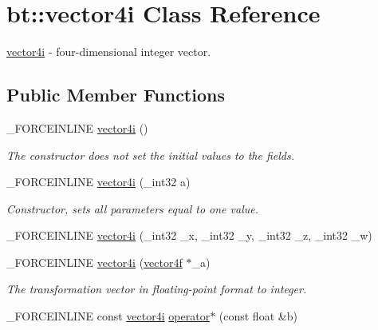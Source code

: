 \hypertarget{classbt_1_1vector4i}{\section{bt\-:\-:vector4i Class Reference}
\label{classbt_1_1vector4i}
}


\hyperlink{classbt_1_1vector4i}{vector4i} -\/ four-\/dimensional integer vector.  


\subsection*{Public Member Functions}
\begin{DoxyCompactItemize}
\item 
\hypertarget{classbt_1_1vector4i_a1dd01384bc4ec3c4c49e8f43f9c1c229}{\-\_\-\-F\-O\-R\-C\-E\-I\-N\-L\-I\-N\-E \hyperlink{classbt_1_1vector4i_a1dd01384bc4ec3c4c49e8f43f9c1c229}{vector4i} ()}\label{classbt_1_1vector4i_a1dd01384bc4ec3c4c49e8f43f9c1c229}

\begin{DoxyCompactList}\small\item\em The constructor does not set the initial values to the fields. \end{DoxyCompactList}\item 
\hypertarget{classbt_1_1vector4i_a7f2c96a45f42c89f9ff14ad58cf3bb3a}{\-\_\-\-F\-O\-R\-C\-E\-I\-N\-L\-I\-N\-E \hyperlink{classbt_1_1vector4i_a7f2c96a45f42c89f9ff14ad58cf3bb3a}{vector4i} (\-\_\-int32 a)}\label{classbt_1_1vector4i_a7f2c96a45f42c89f9ff14ad58cf3bb3a}

\begin{DoxyCompactList}\small\item\em Constructor, sets all parameters equal to one value. \end{DoxyCompactList}\item 
\-\_\-\-F\-O\-R\-C\-E\-I\-N\-L\-I\-N\-E \hyperlink{classbt_1_1vector4i_a77fbb5def0451d35bd42875aab79a344}{vector4i} (\-\_\-int32 \-\_\-x, \-\_\-int32 \-\_\-y, \-\_\-int32 \-\_\-z, \-\_\-int32 \-\_\-w)
\item 
\hypertarget{classbt_1_1vector4i_a4d500bbfcc8ee45014638b83071cc018}{\-\_\-\-F\-O\-R\-C\-E\-I\-N\-L\-I\-N\-E \hyperlink{classbt_1_1vector4i_a4d500bbfcc8ee45014638b83071cc018}{vector4i} (\hyperlink{classbt_1_1vector4f}{vector4f} $\ast$\-\_\-a)}\label{classbt_1_1vector4i_a4d500bbfcc8ee45014638b83071cc018}

\begin{DoxyCompactList}\small\item\em The transformation vector in floating-\/point format to integer. \end{DoxyCompactList}\item 
\hypertarget{classbt_1_1vector4i_a706978c8f1b70ef55e499419161dbf19}{\-\_\-\-F\-O\-R\-C\-E\-I\-N\-L\-I\-N\-E const \hyperlink{classbt_1_1vector4i}{vector4i} \hyperlink{classbt_1_1vector4i_a706978c8f1b70ef55e499419161dbf19}{operator$\ast$} (const float \&b)}\label{classbt_1_1vector4i_a706978c8f1b70ef55e499419161dbf19}


\end{DoxyCompactItemize}
